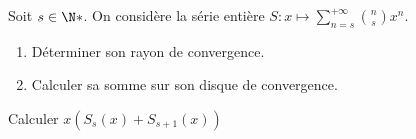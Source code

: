 \begin{enonce}
\begin{exercise}[ID={RMS126 E868},subtitle={CCP MP 2015},tags={}, difficulty={0}]
Soit $s\in\N*$.
On considère la série entière $S:x\mapsto \sum_{n=s}^{+\infty} \binom ns x^n$.
\begin{enumerate}
  \item Déterminer son rayon de convergence.
  \item Calculer sa somme sur son disque de convergence.
\end{enumerate}
\end{exercise}
\begin{solution}
Calculer $x(S_s(x) + S_{s+1}(x))$
\end{solution}
\end{enonce}
